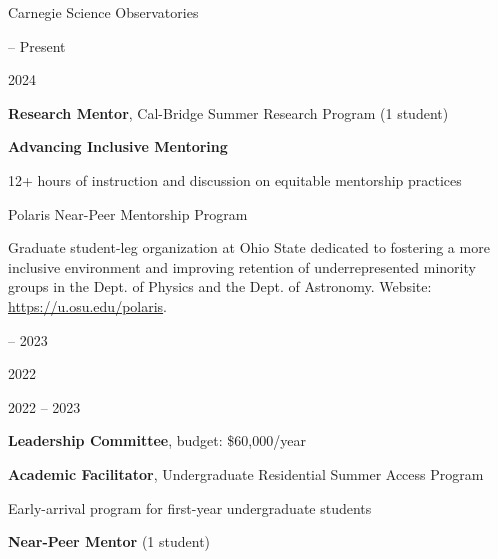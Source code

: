 \documentclass[cv.tex]{subfiles}
\begin{document}
{\color{themecolor} Carnegie Science Observatories}
\par\noindent
\parbox{0.18\textwidth}{%
	 -- Present \par
	2024 \par
	\null \par
}
\hspace{1mm}
\parbox{0.8\textwidth}{%
	\textbf{Research Mentor}, Cal-Bridge Summer Research Program (1 student)
	\par
	\textbf{Advancing Inclusive Mentoring} \par
	12+ hours of instruction and discussion on equitable mentorship practices
	\par
}

\vspace{5mm}
\noindent
{\color{themecolor} Polaris Near-Peer Mentorship Program}
\par\noindent
Graduate student-leg organization at Ohio State dedicated to fostering a more
inclusive environment and improving retention of underrepresented minority
groups in the Dept. of Physics and the Dept. of Astronomy.
Website: \url{https://u.osu.edu/polaris}.
\par\noindent
\parbox{0.18\textwidth}{%
	 -- 2023 \par
	2022 \par
	\null \par
	2022 -- 2023 \par
}
\hspace{1mm}
\parbox{0.8\textwidth}{%
	\textbf{Leadership Committee}, budget: \$60,000/year \par
	\textbf{Academic Facilitator}, Undergraduate Residential Summer Access
	Program \par
	Early-arrival program for first-year undergraduate students \par
	\textbf{Near-Peer Mentor} (1 student) \par
}
\end{document}
